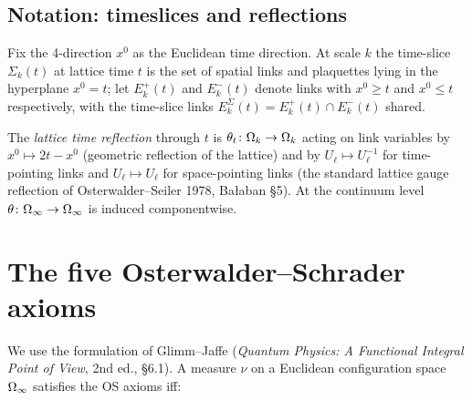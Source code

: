 \subsection{Notation: timeslices and reflections}
\label{subsec:timeslices}

Fix the 4-direction $x^0$ as the Euclidean time direction.  At scale
$k$ the time-slice $\Sigma_k(t)$ at lattice time $t$ is the set of
spatial links and plaquettes lying in the hyperplane $x^0 = t$; let
$E_k^+(t)$ and $E_k^-(t)$ denote links with $x^0 \ge t$ and $x^0 \le t$
respectively, with the time-slice links $E_k^{\Sigma}(t) = E_k^+(t)
\cap E_k^-(t)$ shared.

The \emph{lattice time reflection} through $t$ is
$\theta_t \colon \Omega_k \to \Omega_k$ acting on link variables by
$x^0 \mapsto 2t - x^0$ (geometric reflection of the lattice) and by
$U_\ell \mapsto U_\ell^{-1}$ for time-pointing links and
$U_\ell \mapsto U_\ell$ for space-pointing links (the standard
lattice gauge reflection of Osterwalder--Seiler 1978, Bałaban
\S5).  At the continuum level $\theta \colon \Omega_\infty \to \Omega_\infty$ is
induced componentwise.

\section{The five Osterwalder--Schrader axioms}
\label{sec:os-recap}

We use the formulation of Glimm--Jaffe (\emph{Quantum Physics: A
Functional Integral Point of View}, 2nd ed., \S6.1).  A measure
$\nu$ on a Euclidean configuration space $\Omega_\infty$ satisfies the OS
axioms iff:

